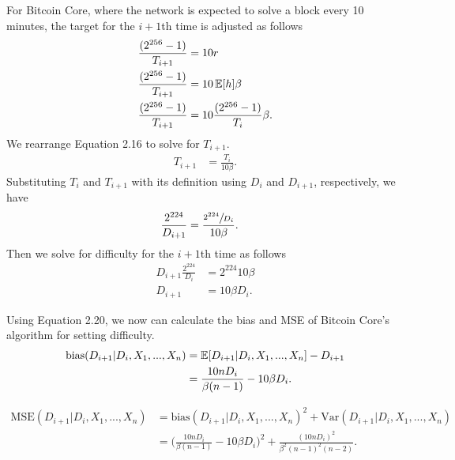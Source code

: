 For Bitcoin Core, where the network is expected to solve a block every 10 minutes, the target for the $i+1$th time is adjusted as follows 
\begin{align}
\frac{(2^{256}-1)}{T_{i+1}} &= 10r \\
\frac{(2^{256}-1)}{T_{i+1}} &= 10\operatorname{\mathbb{E}}[h] \beta \\
\frac{(2^{256}-1)}{T_{i+1}} &= 10\frac{(2^{256}-1)}{T_i}\beta .
\end{align}
We rearrange Equation 2.16 to solve for $T_{i+1}$.
\begin{align}
T_{i+1} &= \frac{T_i}{10\beta}.
\end{align}
Substituting $T_i$ and $T_{i+1}$ with its definition using $D_i$ and $D_{i+1}$, respectively, we have
\begin{align}
\frac{2^{224}}{D_{i+1}} &= \frac{\sfrac{2^{224}}{D_i}}{10\beta}.
\end{align}
Then we solve for difficulty for the $i+1$th time as follows 
\begin{align}
D_{i+1}\frac{2^{224}}{D_i} &= 2^{224}10\beta \\
D_{i+1} &= 10\beta D_i.
\end{align}

\noindent Using Equation 2.20, we now can calculate the bias and MSE of Bitcoin Core's algorithm for setting difficulty. \\
\begin{align}
\text{bias}(D_{i+1}|D_i,X_1,...,X_n) &= \operatorname{\mathbb{E}}[D_{i+1}|D_i,X_1,...,X_n] - D_{i+1} \\
&= \frac{10n D_i}{\beta(n-1)} - 10\beta D_i.
\end{align}

\begin{align}
\text{MSE}(D_{i+1}|D_i,X_1,...,X_n) &= \text{bias}(D_{i+1}|D_i,X_1,...,X_n)^2 + \text{Var}(D_{i+1}|D_i,X_1,...,X_n) \\
&= \Bigg(\frac{10n D_i}{\beta(n-1)} - 10\beta D_i\Bigg)^2 + \frac{(10n D_i)^2}{\beta^2(n-1)^2(n-2)}.
\end{align}

